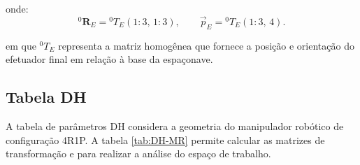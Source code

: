 onde:
\begin{equation}
{}^{0}\!\mathbf{R}_{E} = {}^0T_{E}(1\!:\!3,\,1\!:\!3),
\qquad
\vec p_{E} = {}^0T_{E}(1\!:\!3,\,4).
\end{equation}

em que ${}^0T_{E}$ representa a matriz homogênea que fornece a posição e orientação do efetuador final em relação à base da espaçonave.

\subsection{Tabela DH}
A tabela de parâmetros DH considera a geometria do manipulador robótico de configuração 4R1P.
A tabela \eqref{tab:DH-MR} permite calcular as matrizes de transformação e para realizar a análise do espaço de trabalho.


